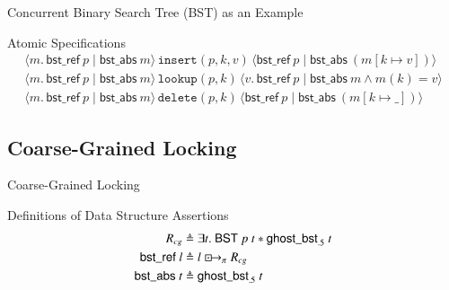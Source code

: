 \documentclass[professionalfonts, xcolor=table]{beamer}
\newcommand{\islock}{\boxdotright}
\newcommand{\treerep}{\ensuremath{\mathsf{bst\_abs}}}
\newcommand{\nodeboxrep}{\ensuremath{\mathsf{bst\_ref}}}
\begin{document}
\begin{frame}[label=bstspec]{Concurrent Binary Search Tree (BST) as an Example}
  \begin{block}{Atomic Specifications}
    \vspace*{-\baselineskip}\setlength\belowdisplayshortskip{0pt}
    \begin{gather*}
      \langle m.\,\nodeboxrep\ p\mid \treerep\ m\rangle\,\texttt{insert}(p, k, v)\,\langle \nodeboxrep\ p\mid \treerep\ (m[k \mapsto v])\rangle\\
      \langle m.\,\nodeboxrep\ p\mid \treerep\ m\rangle\,\texttt{lookup}(p, k)\,\langle v.\,\nodeboxrep\ p\mid \treerep\ m \land m(k) = v\rangle\\
      \langle m.\,\nodeboxrep\ p\mid \treerep\ m\rangle\,\texttt{delete}(p, k)\,\langle \nodeboxrep\ p\mid \treerep\ (m[k \mapsto \_])\rangle
    \end{gather*}
  \end{block}
\end{frame}

\subsection{Coarse-Grained Locking}
\begin{frame}{Coarse-Grained Locking}
  \begin{block}{Definitions of Data Structure Assertions}
    \vspace*{-\baselineskip}\setlength\belowdisplayshortskip{0pt}
    \begin{align*}
      R_{\mathit{cg}} &\triangleq \exists t.\ \mathsf{BST}\ p\ t * \mathsf{ghost\_bst}_{.5}\ t\\
      \nodeboxrep\ l &\triangleq l \islock_\pi R_{\mathit{cg}}\\
      \treerep\ t &\triangleq \mathsf{ghost\_bst}_{.5}\ t
    \end{align*}
  \end{block}
\end{frame}
\end{document}
